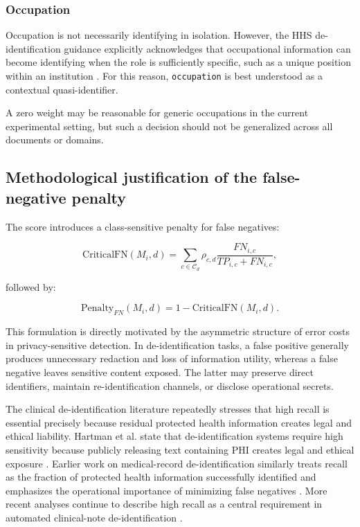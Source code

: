\documentclass[11pt,a4paper]{article}
\begin{document}
\subsubsection{Occupation}

Occupation is not necessarily identifying in isolation. However, the HHS de-identification guidance explicitly acknowledges that occupational information can become identifying when the role is sufficiently specific, such as a unique position within an institution \citep{hhs_hipaa_deidentification}. For this reason, \texttt{occupation} is best understood as a contextual quasi-identifier.

A zero weight may be reasonable for generic occupations in the current experimental setting, but such a decision should not be generalized across all documents or domains.

\subsection{Methodological justification of the false-negative penalty}

The score introduces a class-sensitive penalty for false negatives:

\begin{equation}
    \mathrm{CriticalFN}(M_i,d)=
    \sum_{c\in\mathcal{C}_d}
    \rho_{c,d}
    \frac{FN_{i,c}}{TP_{i,c}+FN_{i,c}},
\end{equation}

followed by:

\begin{equation}
    \mathrm{Penalty}_{FN}(M_i,d)=
    1-\mathrm{CriticalFN}(M_i,d).
\end{equation}

This formulation is directly motivated by the asymmetric structure of error costs in privacy-sensitive detection. In de-identification tasks, a false positive generally produces unnecessary redaction and loss of information utility, whereas a false negative leaves sensitive content exposed. The latter may preserve direct identifiers, maintain re-identification channels, or disclose operational secrets.

The clinical de-identification literature repeatedly stresses that high recall is essential precisely because residual protected health information creates legal and ethical liability. Hartman et al. state that de-identification systems require high sensitivity because publicly releasing text containing PHI creates legal and ethical exposure \citep{hartman_2020}. Earlier work on medical-record de-identification similarly treats recall as the fraction of protected health information successfully identified and emphasizes the operational importance of minimizing false negatives \citep{neamatullah_2008}. More recent analyses continue to describe high recall as a central requirement in automated clinical-note de-identification \citep{abdalla_2025}.
\end{document}
